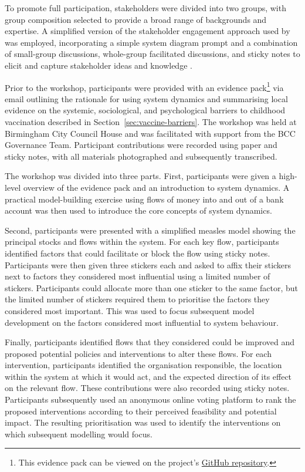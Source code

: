 \documentclass[12pt]{article}
\newcounter{who}
\begin{document}
To promote full participation, stakeholders were divided into two groups, with group composition selected to provide a broad range of backgrounds and expertise. A simplified version of the stakeholder engagement approach used by \citeauthor{michail2025evaluation} was employed, incorporating a simple system diagram prompt and a combination of small-group discussions, whole-group facilitated discussions, and sticky notes to elicit and capture stakeholder ideas and knowledge \cite{michail2025evaluation}.  

Prior to the workshop, participants were provided with an evidence pack\footnote{This evidence pack can be viewed on the project's \href{https://github.com/David-Ellis/Measles-System-Dynamics-BSol/blob/main/pdfs/Measles\%20System\%20Dynamics\%20Project\%20Protocol.pdf}{GitHub repository}.} via email outlining the rationale for using system dynamics and summarising local evidence on the systemic, sociological, and psychological barriers to childhood vaccination described in Section~\ref{sec:vaccine-barriers}. The workshop was held at Birmingham City Council House and was facilitated with support from the BCC Governance Team. Participant contributions were recorded using paper and sticky notes, with all materials photographed and subsequently transcribed.

The workshop was divided into three parts. First, participants were given a high-level overview of the evidence pack and an introduction to system dynamics. A practical model-building exercise using flows of money into and out of a bank account was then used to introduce the core concepts of system dynamics.

Second, participants were presented with a simplified measles model showing the principal stocks and flows within the system. For each key flow, participants identified factors that could facilitate or block the flow using sticky notes. Participants were then given three stickers each and asked to affix their stickers next to factors they considered most influential using a limited number of stickers. Participants could allocate more than one sticker to the same factor, but the limited number of stickers required them to prioritise the factors they considered most important. This was used to focus subsequent model development on the factors considered most influential to system behaviour.

Finally, participants identified flows that they considered could be improved and proposed potential policies and interventions to alter these flows. For each intervention, participants identified the organisation responsible, the location within the system at which it would act, and the expected direction of its effect on the relevant flow. These contributions were also recorded using sticky notes. Participants subsequently used an anonymous online voting platform to rank the proposed interventions according to their perceived feasibility and potential impact. The resulting prioritisation was used to identify the interventions on which subsequent modelling would focus.
\end{document}
